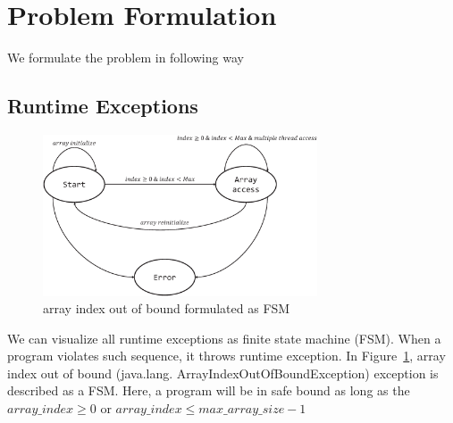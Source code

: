 
\section{Problem Formulation}
\label{sec:form}


We formulate the problem in following way

\subsection{Runtime Exceptions}
\label{subsec:excep}

\begin{figure}[t]
\centering
\includegraphics[width=3.2in]{images/ArrayIndex.eps}
\caption{array index out of bound formulated as FSM}
\label{fig:array}
\end{figure}


We can visualize all runtime exceptions as finite state machine (FSM). When a
program violates such sequence, it throws runtime exception. 
In Figure~\ref{fig:array}, array index out of bound (java.lang.
ArrayIndexOutOfBoundException) exception is described as a FSM. 
Here, a program will be in safe bound as long as the $array\_index \geq 0$ or
$array\_index \leq max\_array\_size - 1$


